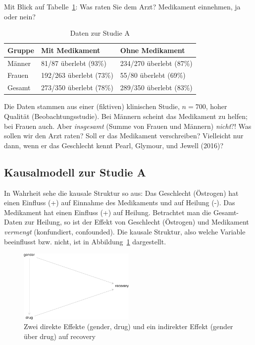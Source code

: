 \documentclass[
  a4paper,
  DIV=11]{scrreprt}
\theoremstyle{definition}
\theoremstyle{remark}
\begin{document}
Mit Blick auf Tabelle~\ref{tbl-studie-a}: Was raten Sie dem Arzt?
Medikament einnehmen, ja oder nein?

\hypertarget{tbl-studie-a}{}
\begin{longtable}{lll}
\caption{\label{tbl-studie-a}Daten zur Studie A }\tabularnewline

\toprule
Gruppe & Mit Medikament & Ohne Medikament \\ 
\midrule
Männer & 81/87 überlebt (93\%) & 234/270 überlebt (87\%) \\ 
Frauen & 192/263 überlebt (73\%) & 55/80 überlebt (69\%) \\ 
Gesamt & 273/350 überlebt (78\%) & 289/350 überlebt (83\%) \\ 
\bottomrule
\end{longtable}

Die Daten stammen aus einer (fiktiven) klinischen Studie, \(n=700\),
hoher Qualität (Beobachtungsstudie). Bei Männern scheint das Medikament
zu helfen; bei Frauen auch. Aber \emph{insgesamt} (Summe von Frauen und
Männern) \emph{nicht}?! Was sollen wir den Arzt raten? Soll er das
Medikament verschreiben? Vielleicht nur dann, wenn er das Geschlecht
kennt Pearl, Glymour, und Jewell (2016)?

\hypertarget{kausalmodell-zur-studie-a}{%
\subsection{Kausalmodell zur Studie A}\label{kausalmodell-zur-studie-a}}

In Wahrheit sehe die kausale Struktur so aus: Das Geschlecht (Östrogen)
hat einen Einfluss (+) auf Einnahme des Medikaments und auf Heilung (-).
Das Medikament hat einen Einfluss (+) auf Heilung. Betrachtet man die
Gesamt-Daten zur Heilung, so ist der Effekt von Geschlecht (Östrogen)
und Medikament \emph{vermengt} (konfundiert, confounded). Die kausale
Struktur, also welche Variable beeinflusst bzw. nicht, ist in
Abbildung~\ref{fig-dag-studie-a} dargestellt.

\begin{figure}

{\centering \includegraphics[width=0.5\textwidth,height=\textheight]{./kausal_files/figure-pdf/fig-dag-studie-a-1.pdf}

}

\caption{\label{fig-dag-studie-a}Zwei direkte Effekte (gender, drug) und
ein indirekter Effekt (gender über drug) auf recovery}

\end{figure}
\end{document}
